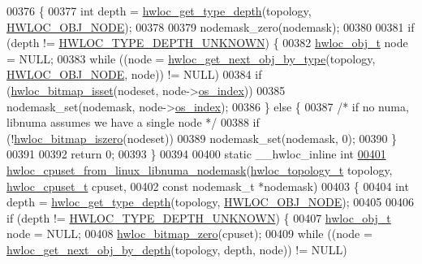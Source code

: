 \begin{DoxyCode}
00376 \{
00377   \textcolor{keywordtype}{int} depth = \hyperlink{a00046_gaea7c64dd59467f5201ba87712710b14d}{hwloc_get_type_depth}(topology, \hyperlink{a00041_ggacd37bb612667dc437d66bfb175a8dc55aaf0964881117bdedf1a5e9332cd120dd}{HWLOC_OBJ_NODE});
00378 
00379   nodemask\_zero(nodemask);
00380 
00381   \textcolor{keywordflow}{if} (depth != \hyperlink{a00046_ggaf4e663cf42bbe20756b849c6293ef575a0565ab92ab72cb0cec91e23003294aad}{HWLOC_TYPE_DEPTH_UNKNOWN}) \{
00382     \hyperlink{a00016}{hwloc_obj_t} node = NULL;
00383     \textcolor{keywordflow}{while} ((node = \hyperlink{a00053_ga5f08ceb69375341e73563cfe2e77534e}{hwloc_get_next_obj_by_type}(topology, \hyperlink{a00041_ggacd37bb612667dc437d66bfb175a8dc55aaf0964881117bdedf1a5e9332cd120dd}{HWLOC_OBJ_NODE}, node)) !=
       NULL)
00384       \textcolor{keywordflow}{if} (\hyperlink{a00065_ga2583f44cbdb5fff2ea40efdcf3975d3f}{hwloc_bitmap_isset}(nodeset, node->\hyperlink{a00016_a61a7a80a68eaccbaaa28269e678c81a9}{os_index}))
00385         nodemask\_set(nodemask, node->\hyperlink{a00016_a61a7a80a68eaccbaaa28269e678c81a9}{os_index});
00386   \} \textcolor{keywordflow}{else} \{
00387     \textcolor{comment}{/* if no numa, libnuma assumes we have a single node */}
00388     \textcolor{keywordflow}{if} (!\hyperlink{a00065_gaa94fed35d2a598bc4a8657b6955b7bf5}{hwloc_bitmap_iszero}(nodeset))
00389       nodemask\_set(nodemask, 0);
00390   \}
00391 
00392   \textcolor{keywordflow}{return} 0;
00393 \}
00394 
00400 \textcolor{keyword}{static} \_\_hwloc\_inline \textcolor{keywordtype}{int}
\hypertarget{a00034_source_l00401}{}\hyperlink{a00070_gac24c9e4bb2eab3e23b2039559adc9df8}{00401} \hyperlink{a00070_gac24c9e4bb2eab3e23b2039559adc9df8}{hwloc_cpuset_from_linux_libnuma_nodemask}(\hyperlink{a00039_ga9d1e76ee15a7dee158b786c30b6a6e38}{hwloc_topology_t} topology, 
      \hyperlink{a00040_ga4bbf39b68b6f568fb92739e7c0ea7801}{hwloc_cpuset_t} cpuset,
00402                                         \textcolor{keyword}{const} nodemask\_t *nodemask)
00403 \{
00404   \textcolor{keywordtype}{int} depth = \hyperlink{a00046_gaea7c64dd59467f5201ba87712710b14d}{hwloc_get_type_depth}(topology, \hyperlink{a00041_ggacd37bb612667dc437d66bfb175a8dc55aaf0964881117bdedf1a5e9332cd120dd}{HWLOC_OBJ_NODE});
00405 
00406   \textcolor{keywordflow}{if} (depth != \hyperlink{a00046_ggaf4e663cf42bbe20756b849c6293ef575a0565ab92ab72cb0cec91e23003294aad}{HWLOC_TYPE_DEPTH_UNKNOWN}) \{
00407     \hyperlink{a00016}{hwloc_obj_t} node = NULL;
00408     \hyperlink{a00065_ga6c540b9fe63b8223b6aba46d56dd63b8}{hwloc_bitmap_zero}(cpuset);
00409     \textcolor{keywordflow}{while} ((node = \hyperlink{a00053_gab7c1dce3f42ece5bfa621e87cf332418}{hwloc_get_next_obj_by_depth}(topology, depth, node)) != NULL)

\end{DoxyCode}
